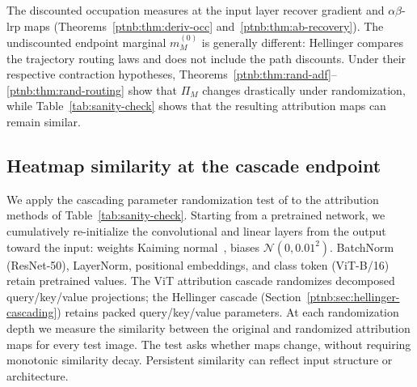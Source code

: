The discounted occupation measures at the input layer recover gradient and $\alpha\beta$-\ac{lrp} maps (Theorems~\ref{ptnb:thm:deriv-occ} and~\ref{ptnb:thm:ab-recovery}). The undiscounted endpoint marginal $m^{(0)}_M$ is generally different: Hellinger compares the trajectory routing laws and does not include the path discounts. Under their respective contraction hypotheses, Theorems~\ref{ptnb:thm:rand-adf}--\ref{ptnb:thm:rand-routing} show that $\Pi_M$ changes drastically under randomization, while Table~\ref{tab:sanity-check} shows that the resulting attribution maps can remain similar. 

\subsection{Heatmap similarity at the cascade endpoint}\label{ptnb:app:sanity-heatmap}

We apply the cascading parameter randomization test of \textcite{Adebayo2018sanity} to the attribution methods of Table~\ref{tab:sanity-check}. Starting from a pretrained network, we cumulatively re-initialize the convolutional and linear layers from the output toward the input: weights Kaiming normal~\parencite{He2015delving}, biases $\mathcal{N}(0, 0.01^2)$. BatchNorm (ResNet-50), LayerNorm, positional embeddings, and class token (ViT-B/16) retain pretrained values. The ViT attribution cascade randomizes decomposed query/key/value projections; the Hellinger cascade (Section~\ref{ptnb:sec:hellinger-cascading}) retains packed query/key/value parameters. At each randomization depth we measure the similarity between the original and randomized attribution maps for every test image. The test asks whether maps change, without requiring monotonic similarity decay. Persistent similarity can reflect input structure or architecture.

